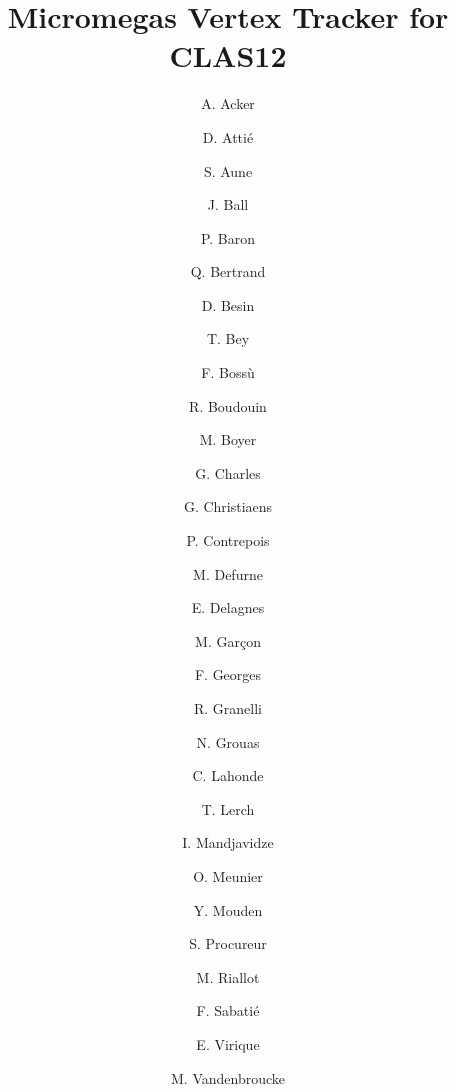 \title{Micromegas Vertex Tracker for CLAS12}

\author[A]{A. Acker} 
\author[A]{D. Atti\'e}
\author[A]{S. Aune}
\author[A]{J. Ball}
\author[A]{P. Baron}
\author[A]{Q. Bertrand}
\author[A]{D. Besin}
\author[A]{T. Bey}
\author[A]{F. Boss\`u}
\author[A]{R. Boudouin}
\author[A]{M. Boyer}
\author[A]{G. Charles}
\author[A]{G. Christiaens}
\author[A]{P. Contrepois}
\author[A]{M. Defurne}
\author[A]{E. Delagnes}
\author[A]{M. Garçon}
\author[A]{F. Georges}
\author[A]{R. Granelli}
\author[A]{N. Grouas}
\author[A]{C. Lahonde}
\author[A]{T. Lerch}
\author[A]{I. Mandjavidze}
\author[A]{O. Meunier}
\author[A]{Y. Mouden}
\author[A]{S. Procureur}
\author[A]{M. Riallot}
\author[A]{F. Sabati\'e}
\author[A]{E. Virique}
\author[A]{M. Vandenbroucke}



\address[A]{Irfu, CEA, Universit\'{e} Paris-Saclay, 91191, Gif-sur-Yvette, France}
